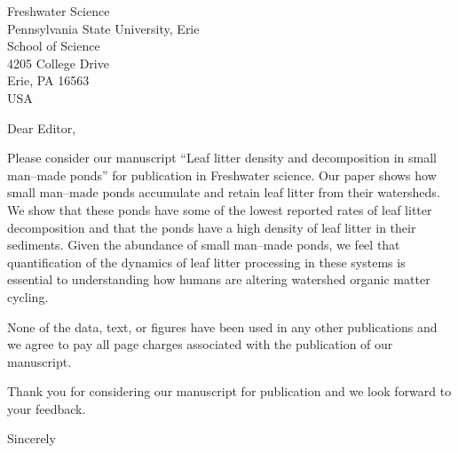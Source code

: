 \documentclass{letter}
\begin{document}
\begin{letter}{Freshwater Science \\ Pennsylvania State University, Erie \\ School of Science \\ 4205 College Drive \\ Erie, PA 16563 \\ USA}

\opening{Dear Editor,}
 
Please consider our manuscript ``Leaf litter density and decomposition in small man--made ponds'' for publication in Freshwater science.  Our paper shows how small man--made ponds accumulate and retain leaf litter from their watersheds.  We show that these ponds have some of the lowest reported rates of leaf litter decomposition and that the ponds have a high density of leaf litter in their sediments.  Given the abundance of small man--made ponds, we feel that quantification of the dynamics of leaf litter processing in these systems is essential to understanding how humans are altering watershed organic matter cycling.

None of the data, text, or figures have been used in any other publications and we agree to pay all page charges associated with the publication of our manuscript. 

Thank you for considering our manuscript for publication and we look forward to your feedback.

\closing{Sincerely}

\end{letter}
\end{document}

